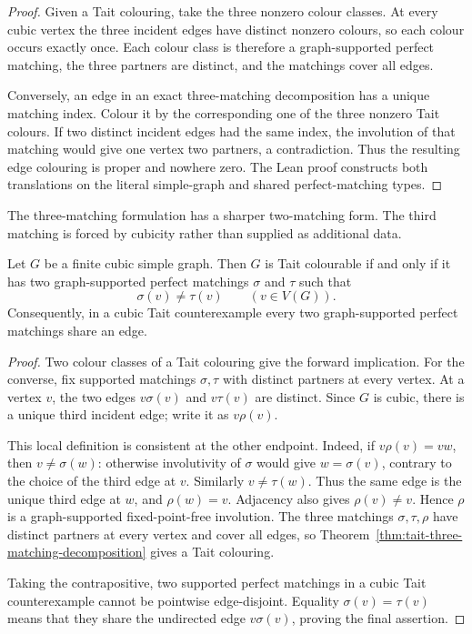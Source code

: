 \begin{proof}
Given a Tait colouring, take the three nonzero colour classes.  At every
cubic vertex the three incident edges have distinct nonzero colours, so each
colour occurs exactly once.  Each colour class is therefore a graph-supported
perfect matching, the three partners are distinct, and the matchings cover
all edges.

Conversely, an edge in an exact three-matching decomposition has a unique
matching index.  Colour it by the corresponding one of the three nonzero
Tait colours.  If two distinct incident edges had the same index, the
involution of that matching would give one vertex two partners, a
contradiction.  Thus the resulting edge colouring is proper and nowhere
zero.  The Lean proof constructs both translations on the literal
simple-graph and shared perfect-matching types.
\end{proof}

The three-matching formulation has a sharper two-matching form.  The third
matching is forced by cubicity rather than supplied as additional data.

\begin{corollary}
\label{cor:tait-two-matching-criterion}
Let \(G\) be a finite cubic simple graph.  Then \(G\) is Tait colourable if
and only if it has two graph-supported perfect matchings \(\sigma\) and
\(\tau\) such that
\[
                 \sigma(v)\ne\tau(v)\qquad(v\in V(G)).
\]
Consequently, in a cubic Tait counterexample every two graph-supported
perfect matchings share an edge.
\end{corollary}

\begin{proof}
Two colour classes of a Tait colouring give the forward implication.  For
the converse, fix supported matchings \(\sigma,\tau\) with distinct partners
at every vertex.  At a vertex \(v\), the two edges
\(v\sigma(v)\) and \(v\tau(v)\) are distinct.  Since \(G\) is cubic, there
is a unique third incident edge; write it as \(v\rho(v)\).

This local definition is consistent at the other endpoint.  Indeed, if
\(v\rho(v)=vw\), then \(v\ne\sigma(w)\): otherwise involutivity of
\(\sigma\) would give \(w=\sigma(v)\), contrary to the choice of the third
edge at \(v\).  Similarly \(v\ne\tau(w)\).  Thus the same edge is the
unique third edge at \(w\), and \(\rho(w)=v\).  Adjacency also gives
\(\rho(v)\ne v\).  Hence \(\rho\) is a graph-supported fixed-point-free
involution.  The three matchings \(\sigma,\tau,\rho\) have distinct partners
at every vertex and cover all edges, so
Theorem~\ref{thm:tait-three-matching-decomposition} gives a Tait colouring.

Taking the contrapositive, two supported perfect matchings in a cubic Tait
counterexample cannot be pointwise edge-disjoint.  Equality
\(\sigma(v)=\tau(v)\) means that they share the undirected edge
\(v\sigma(v)\), proving the final assertion.
\end{proof}

